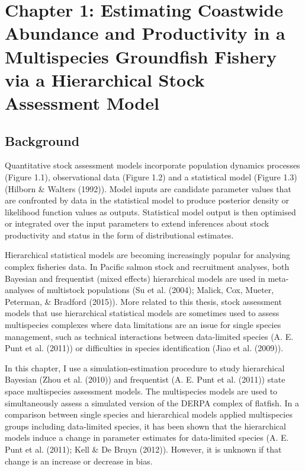\documentclass[12pt,]{scrartcl}
\begin{document}
\section{Chapter 1: Estimating Coastwide Abundance and Productivity in a
Multispecies Groundfish Fishery via a Hierarchical Stock Assessment
Model}\label{chapter-1-estimating-coastwide-abundance-and-productivity-in-a-multispecies-groundfish-fishery-via-a-hierarchical-stock-assessment-model}

\subsection{Background}\label{background-1}

Quantitative stock assessment models incorporate population dynamics
processes (Figure 1.1), observational data (Figure 1.2) and a
statistical model (Figure 1.3) (Hilborn \& Walters (1992)). Model inputs
are candidate parameter values that are confronted by data in the
statistical model to produce posterior density or likelihood function
values as outputs. Statistical model output is then optimised or
integrated over the input parameters to extend inferences about stock
productivity and status in the form of distributional estimates.

Hierarchical statistical models are becoming increasingly popular for
analysing complex fisheries data. In Pacific salmon stock and
recruitment analyses, both Bayesian and frequentist (mixed effects)
hierarchical models are used in meta-analyses of multistock populations
(Su et al. (2004); Malick, Cox, Mueter, Peterman, \& Bradford (2015)).
More related to this thesis, stock assessment models that use
hierarchical statistical models are sometimes used to assess
multispecies complexes where data limitations are an issue for single
species management, such as technical interactions between data-limited
species (A. E. Punt et al. (2011)) or difficulties in species
identification (Jiao et al. (2009)).

In this chapter, I use a simulation-estimation procedure to study
hierarchical Bayesian (Zhou et al. (2010)) and frequentist (A. E. Punt
et al. (2011)) state space multispecies assessment models. The
multispecies models are used to simultaneously assess a simulated
version of the DERPA complex of flatfish. In a comparison between single
species and hierarchical models applied multispecies groups including
data-limited species, it has been shown that the hierarchical models
induce a change in parameter estimates for data-limited species (A. E.
Punt et al. (2011); Kell \& De Bruyn (2012)). However, it is unknown if
that change is an increase or decrease in bias.
\end{document}

